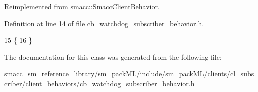 Reimplemented from \hyperlink{classsmacc_1_1SmaccClientBehavior_a7962382f93987c720ad432fef55b123f}{smacc\+::\+Smacc\+Client\+Behavior}.



Definition at line 14 of file cb\+\_\+watchdog\+\_\+subscriber\+\_\+behavior.\+h.


\begin{DoxyCode}
15     \{
16     \}
\end{DoxyCode}


The documentation for this class was generated from the following file\+:\begin{DoxyCompactItemize}
\item 
smacc\+\_\+sm\+\_\+reference\+\_\+library/sm\+\_\+pack\+M\+L/include/sm\+\_\+pack\+M\+L/clients/cl\+\_\+subscriber/client\+\_\+behaviors/\hyperlink{sm__packML_2include_2sm__packML_2clients_2cl__subscriber_2client__behaviors_2cb__watchdog__subscriber__behavior_8h}{cb\+\_\+watchdog\+\_\+subscriber\+\_\+behavior.\+h}\end{DoxyCompactItemize}
